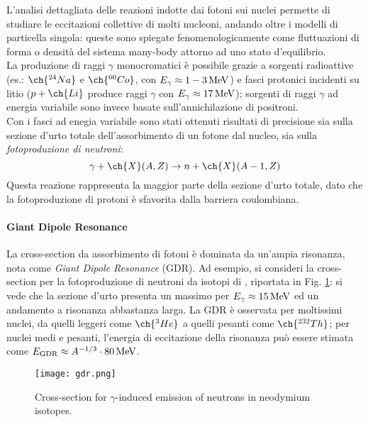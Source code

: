 L'analisi dettagliata delle reazioni indotte dai fotoni sui nuclei permette di studiare le eccitazioni collettive di molti nucleoni, andando oltre i modelli di particella singola: queste sono spiegate fenomenologicamente come fluttuazioni di forma o densità del sistema many-body attorno ad uno stato d'equilibrio.\\
La produzione di raggi $ \gamma $ monocromatici è possibile grazie a sorgenti radioattive (es.: $ \ch{^{24}Na} $ e $ \ch{^{60}Co} $, con $ E_{\gamma} \approx 1-3\,\mathrm{MeV} $) e fasci protonici incidenti su litio ($ p + \ch{Li} $ produce raggi $ \gamma $ con $ E_{\gamma} \approx 17\,\mathrm{MeV} $); sorgenti di raggi $ \gamma $ ad energia variabile sono invece basate sull'annichilazione di positroni.\\
Con i fasci ad enegia variabile sono stati ottenuti risultati di precisione sia sulla sezione d'urto totale dell'assorbimento di un fotone dal nucleo, sia sulla \textit{fotoproduzione di neutroni}:
\begin{equation*}
	\gamma + \ch{X}(A,Z)\rightarrow n + \ch{X}(A-1,Z)
\end{equation*}
Questa reazione rappresenta la maggior parte della sezione d'urto totale, dato che la fotoproduzione di protoni è sfavorita dalla barriera coulombiana.

\paragraph{Giant Dipole Resonance}

La cross-section da assorbimento di fotoni è dominata da un'ampia risonanza, nota come \textit{Giant Dipole Resonance} (GDR). Ad esempio, si consideri la cross-section per la fotoproduzione di neutroni da isotopi di , riportata in Fig. \ref{gdr-nd}: si vede che la sezione d'urto presenta un massimo per $ E_{\gamma} \approx 15\,\mathrm{MeV} $ ed un andamento a risonanza abbastanza larga. La GDR è osservata per moltissimi nuclei, da quelli leggeri come $ \ch{^3He} $ a quelli pesanti come $ \ch{^{232}Th} $; per nuclei medi e pesanti, l'energia di eccitazione della risonanza può essere stimata come $ E_{\text{GDR}} \approx A^{-1/3} \cdot 80\,\mathrm{MeV} $.

\begin{figure}
	\centering
	\texttt{[image: gdr.png]}
	\caption{Cross-section for $ \gamma $-induced emission of neutrons in neodymium isotopes.}
	\label{gdr-nd}
\end{figure}









